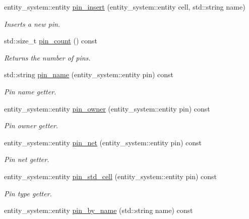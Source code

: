 \begin{DoxyCompactItemize}
entity\-\_\-system\-::entity \hyperlink{classophidian_1_1netlist_1_1netlist_af4dad683c9e4a98a0e8fcdcd811fca33}{pin\-\_\-insert} (entity\-\_\-system\-::entity cell, std\-::string name)
\begin{DoxyCompactList}\small\item\em Inserts a new pin. \end{DoxyCompactList}\item 
std\-::size\-\_\-t \hyperlink{classophidian_1_1netlist_1_1netlist_ad7ca89ecd797580236cbf4203c0298b7}{pin\-\_\-count} () const 
\begin{DoxyCompactList}\small\item\em Returns the number of pins. \end{DoxyCompactList}\item 
std\-::string \hyperlink{classophidian_1_1netlist_1_1netlist_aebf89d5c93fca49161ec165f649d40ad}{pin\-\_\-name} (entity\-\_\-system\-::entity pin) const 
\begin{DoxyCompactList}\small\item\em Pin name getter. \end{DoxyCompactList}\item 
entity\-\_\-system\-::entity \hyperlink{classophidian_1_1netlist_1_1netlist_ac81714676baaba930e4c9bb5d51ac802}{pin\-\_\-owner} (entity\-\_\-system\-::entity pin) const 
\begin{DoxyCompactList}\small\item\em Pin owner getter. \end{DoxyCompactList}\item 
entity\-\_\-system\-::entity \hyperlink{classophidian_1_1netlist_1_1netlist_a60594e7cbf1b87e5f3499b365e5c799c}{pin\-\_\-net} (entity\-\_\-system\-::entity pin) const 
\begin{DoxyCompactList}\small\item\em Pin net getter. \end{DoxyCompactList}\item 
entity\-\_\-system\-::entity \hyperlink{classophidian_1_1netlist_1_1netlist_a70fc0a0808f2585c9910ebdcf79fe3bd}{pin\-\_\-std\-\_\-cell} (entity\-\_\-system\-::entity pin) const 
\begin{DoxyCompactList}\small\item\em Pin type getter. \end{DoxyCompactList}\item 
entity\-\_\-system\-::entity \hyperlink{classophidian_1_1netlist_1_1netlist_a345796e011281d1791957c2f321aed12}{pin\-\_\-by\-\_\-name} (std\-::string name) const 

\end{DoxyCompactItemize}
